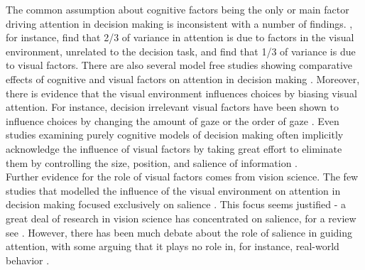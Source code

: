 The common assumption about cognitive factors being the only or main factor driving attention in decision making is inconsistent with a number of findings. \cite{vanderlans2008}, for instance, find that 2/3 of variance in attention is due to factors in the visual environment, unrelated to the decision task, and \cite{towal2013a} find that 1/3 of variance is due to visual factors. There are also several model free studies showing comparative effects of cognitive and visual factors on attention in decision making \citep{gidloef2017a, orquin2015a, orquin2019a}. Moreover, there is evidence that the visual environment influences choices by biasing visual attention. For instance, decision irrelevant visual factors have been shown to influence choices by changing the amount of gaze \citep{peschel2019, chandon2009a} or the order of gaze \citep{reeck2017a}. Even studies examining purely cognitive models of decision making often implicitly acknowledge the influence of visual factors by taking great effort to eliminate them by controlling the size, position, and salience of information \citep{brandstatter2014, gloeckner2011a, perkovic2018}.\\

Further evidence for the role of visual factors comes from vision science. The few studies that modelled the influence of the visual environment on attention in decision making focused exclusively on salience \citep{chen2013,navalpakkam2010, towal2013a}. This focus seems justified - a great deal of research in vision science has concentrated on salience, for a review see \cite{borji2012a}.  However, there has been much debate about the role of salience in guiding attention, with some arguing that it plays no role in, for instance, real-world behavior \citep{tatler2011a}.\\

